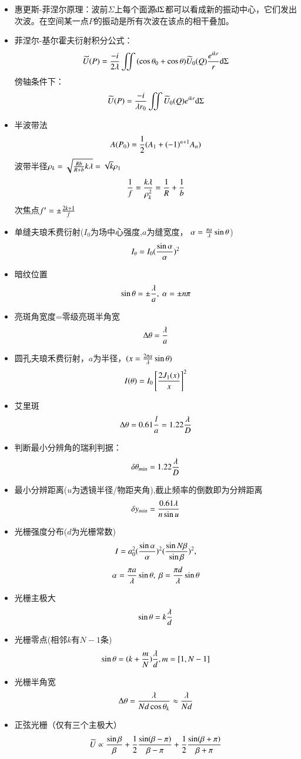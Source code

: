 \documentclass[UTF8,8pt]{ctexart}
\begin{document}
\begin{multicols}{3}

\begin{itemize}
\item 惠更斯-菲涅尔原理：波前$\Sigma$上每个面源$\mathrm{d}\Sigma$都可以看成新的振动中心，它们发出次波。在空间某一点$P$的振动是所有次波在该点的相干叠加。
\item 菲涅尔-基尔霍夫衍射积分公式：
    $$\widetilde{U}(P)=\frac{-i}{2\lambda}\iint{(\cos\theta_0+\cos\theta)\widetilde{U}_0(Q)\frac{e^{ikr}}{r}\mathrm{d}\Sigma}$$
    傍轴条件下：
    $$\widetilde{U}(P)=\frac{-i}{\lambda r_0}\iint{\widetilde{U}_0(Q)e^{ikr}\mathrm{d}\Sigma}$$
\item 半波带法
    $$A(P_0)=\frac{1}{2}(A_1+(-1)^{n+1}A_n)$$
    波带半径$\rho_k=\sqrt{\frac{Rb}{R+b}k\lambda}=\sqrt{k}\rho_1$
    $$\frac{1}{f}=\frac{k\lambda}{\rho_k^2}=\frac{1}{R}+\frac{1}{b}$$
    次焦点$f'=\pm \frac{2k+1}{f}$
\item 单缝夫琅禾费衍射($I_0$为场中心强度,$a$为缝宽度， $\alpha=\frac{\pi a}{\lambda}\sin\theta$)
    $$I_\theta=I_0(\frac{\sin\alpha}{\alpha})^2$$ 
\item 暗纹位置
    $$\sin\t=\pm\f{\l}{a},\ \a=\pm n\pi$$
\item 亮斑角宽度=零级亮斑半角宽
    $$\Delta\theta=\frac{\lambda}{a}$$
\item 圆孔夫琅禾费衍射，$a$为半径，$(x=\frac{2\pi a}{\lambda}\sin\theta)$
    $$I(\theta)=I_0\left[\frac{2J_1(x)}{x}\right]^2$$
\item 艾里斑
    $$\Delta\theta=0.61\frac{l}{a}=1.22\frac{\lambda}{D}$$
\item  判断最小分辨角的瑞利判据：
    $$\delta \theta_{min}=1.22\frac{\lambda}{D}$$
\item 最小分辨距离($u$为透镜半径/物距夹角),截止频率的倒数即为分辨距离
    $$\delta y_{min}=\frac{0.61\lambda}{n\sin u}$$
\item 光栅强度分布($d$为光栅常数)
    $$I=a_0^2(\frac{\sin\alpha}{\alpha})^2(\frac{\sin N\beta}{\sin\beta})^2,$$
    $$\alpha=\frac{\pi a}{\lambda}\sin\theta,\ \beta=\frac{\pi d}{\lambda}\sin\theta$$
\item 光栅主极大
    $$\sin\theta=k\frac{\lambda}{d}$$
\item 光栅零点(相邻$k$有$N-1$条)
    $$\sin\theta=(k+\frac{m}{N})\frac{\lambda}{d},m=[1,N-1]$$
\item 光栅半角宽
    $$\Delta\theta=\frac{\lambda}{Nd\cos\theta_k} \approx \frac{\lambda}{Nd}$$
\item 正弦光栅（仅有三个主极大）
    $$\widetilde{U} \propto \frac{\sin\beta}{\beta}+\frac{1}{2}\frac{\sin(\beta-\pi)}{\beta-\pi}+\frac{1}{2}\frac{\sin(\beta+\pi)}{\beta+\pi}$$

\end{itemize}
\end{multicols}
\end{document}
